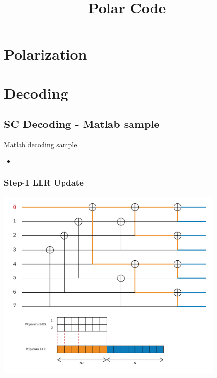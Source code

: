 \documentclass{beamer}
\title{Polar Code}
\begin{document}
\begin{frame}
\titlepage
\end{frame}

\begin{frame}
	\tableofcontents
\end{frame}

\section{Polarization}
\section{Decoding}

\subsection{SC Decoding - Matlab sample}

\begin{frame}{Matlab decoding sample}
  \begin{itemize}
      \item 
  \end{itemize}
\end{frame}

\begin{frame}
\frametitle{Step-1 LLR Update}
  \begin{center}
  \includegraphics[width=0.85\textwidth]{pics/polar_-_SC_llr_1.png}
  \end{center}
\end{frame}
\end{document}
